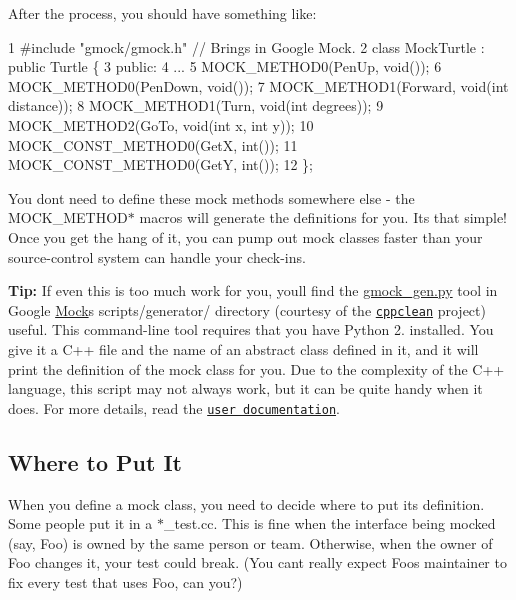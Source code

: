 After the process, you should have something like\+:


\begin{DoxyCode}
1 #include "gmock/gmock.h"  // Brings in Google Mock.
2 class MockTurtle : public Turtle \{
3  public:
4   ...
5   MOCK\_METHOD0(PenUp, void());
6   MOCK\_METHOD0(PenDown, void());
7   MOCK\_METHOD1(Forward, void(int distance));
8   MOCK\_METHOD1(Turn, void(int degrees));
9   MOCK\_METHOD2(GoTo, void(int x, int y));
10   MOCK\_CONST\_METHOD0(GetX, int());
11   MOCK\_CONST\_METHOD0(GetY, int());
12 \};
\end{DoxyCode}


You don\textquotesingle{}t need to define these mock methods somewhere else -\/ the {\ttfamily M\+O\+C\+K\+\_\+\+M\+E\+T\+H\+O\+D$\ast$} macros will generate the definitions for you. It\textquotesingle{}s that simple! Once you get the hang of it, you can pump out mock classes faster than your source-\/control system can handle your check-\/ins.

{\bfseries Tip\+:} If even this is too much work for you, you\textquotesingle{}ll find the {\ttfamily \hyperlink{gmock__gen_8py}{gmock\+\_\+gen.\+py}} tool in Google \hyperlink{classMock}{Mock}\textquotesingle{}s {\ttfamily scripts/generator/} directory (courtesy of the \href{http://code.google.com/p/cppclean/}{\tt cppclean} project) useful. This command-\/line tool requires that you have Python 2. installed. You give it a C++ file and the name of an abstract class defined in it, and it will print the definition of the mock class for you. Due to the complexity of the C++ language, this script may not always work, but it can be quite handy when it does. For more details, read the \href{http://code.google.com/p/googlemock/source/browse/trunk/scripts/generator/README}{\tt user documentation}.

\subsection*{Where to Put It}

When you define a mock class, you need to decide where to put its definition. Some people put it in a {\ttfamily $\ast$\+\_\+test.cc}. This is fine when the interface being mocked (say, {\ttfamily Foo}) is owned by the same person or team. Otherwise, when the owner of {\ttfamily Foo} changes it, your test could break. (You can\textquotesingle{}t really expect {\ttfamily Foo}\textquotesingle{}s maintainer to fix every test that uses {\ttfamily Foo}, can you?)

